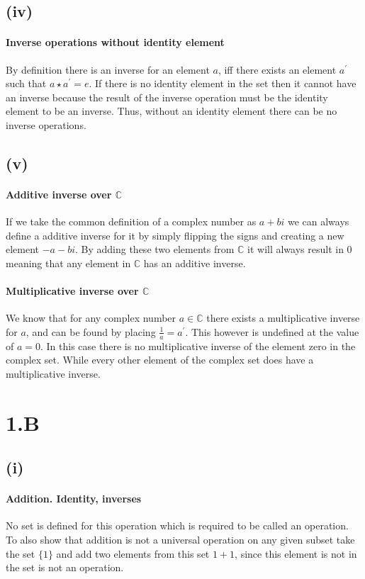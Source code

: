 \documentclass{article}
\begin{document}
    \subsection*{(iv)}
      \paragraph{Inverse operations without identity element}
      By definition there is an inverse for an element $a$, iff there exists an element $a^{\prime}$ such that $a \star a^{\prime} = e$. If there is no identity element in the set then it cannot have an inverse because the result of the inverse operation must be the identity element to be an inverse. Thus, without an identity element there can be no inverse operations.

    \subsection*{(v)}
      \paragraph{Additive inverse over $\mathbb{C}$}
      If we take the common definition of a complex number as $a + bi$ we can always define a additive inverse for it by simply flipping the signs and creating a new element $-a - bi$. By adding these two elements from $\mathbb{C}$ it will always result in $0$ meaning that any element in $\mathbb{C}$ has an additive inverse.

      \paragraph{Multiplicative inverse over $\mathbb{C}$}
      We know that for any complex number $a \in \mathbb{C}$ there exists a multiplicative inverse for $a$, and can be found by placing $\frac{1}{a} = a^{\prime}$. This however is undefined at the value of $a=0$. In this case there is no multiplicative inverse of the element zero in the complex set. While every other element of the complex set does have a multiplicative inverse.

  
  \section*{1.B}
    \subsection*{(i)}
      \paragraph{Addition. Identity, inverses}
      No set is defined for this operation which is required to be called an operation. To also show that addition is not a universal operation on any given subset take the set $\{1\}$ and add two elements from this set $1+1$, since this element is not in the set is not an operation.
\end{document}
